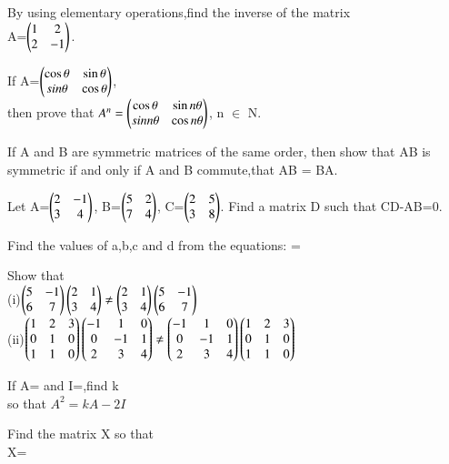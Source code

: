 \item By using elementary operations,find the inverse of the matrix\\
A=$\begin{pmatrix}1 &2\\2 &-1\end{pmatrix}$.\\

\item If A=$\begin{pmatrix}\cos\theta &\sin\theta\\ \-sin\theta &\cos\theta\end{pmatrix}$,\\then prove that $A^{n}=\begin{pmatrix}\cos\theta &\sin n\theta\\\-sin n\theta &\cos n\theta\end{pmatrix}$, n $\in$ N.\\
\item If A and B are symmetric matrices of the same order, then show that AB is symmetric if and only if A and B commute,that AB = BA.\\
\item Let A=$\begin{pmatrix}2 &-1\\3 &4\end{pmatrix}$, B=$\begin{pmatrix}5 &2\\7 &4\end{pmatrix}$, C=$\begin{pmatrix}2 &5\\3 &8\end{pmatrix}$. Find a matrix D such that CD-AB=0. 
\item Find the values of a,b,c and d from the equations:  = 
\item Show that\\
(i)$\begin{pmatrix}5 &-1\\6 &7\end{pmatrix}\begin{pmatrix}2 &1\\3 &4\end{pmatrix}\neq\begin{pmatrix}2 &1\\3 &4\end{pmatrix}\begin{pmatrix}5 &-1\\6 &7\end{pmatrix}$
\\
(ii)$\begin{pmatrix}1 &2 &3\\0 &1 &0\\1 &1 &0\end{pmatrix}\begin{pmatrix}-1 &1 &0\\0 &-1 &1\\2 &3 &4\end{pmatrix}\neq \begin{pmatrix}-1 &1 &0\\0 &-1 &1\\2 &3 &4\end{pmatrix}\begin{pmatrix}1 &2 &3\\0 &1 &0\\1 &1 &0\end{pmatrix}$\\
\item If A= and I=,find k\\
 so that $A^2=kA-2I$\\
  \item Find the matrix X so that\\ X=\\
